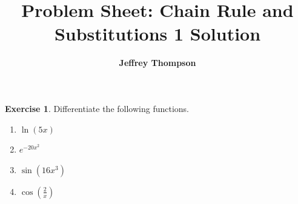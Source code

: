 \documentclass[a4paper]{article}
\theoremstyle{plain} %
\theoremstyle{definition} %
\newtheorem{exercise}{Exercise}
\numberwithin{equation}{subsection}
\begin{document}

\title{\textbf{Problem Sheet: Chain Rule and Substitutions 1 Solution}}




\author{\textbf{Jeffrey Thompson}}
\maketitle

\begin{exercise}
Differentiate the following functions.
\begin{enumerate}
    \item $\ln(5x)$
    \item $e^{-20x^2}$
    \item $\sin(16x^3)$
    \item $\cos\!\left(\frac{2}{x}\right)$
\end{enumerate}
\end{exercise}
\end{document}
